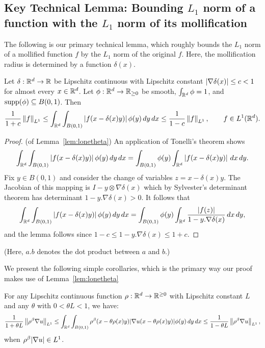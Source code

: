 \subsection{Key Technical Lemma: Bounding $L_1$ norm of a
  function with the $L_1$ norm of its
    mollification}\label{sec:key_lemma}
The following is our primary technical lemma, which roughly bounds the
$L_1$ norm of a mollified function $f$ by the $L_1$
norm of the original $f$. Here, the mollification radius is
determined by a function $\delta(x)$.
\begin{lemma} \label{lem:lonetheta} 

  Let
  $\delta:\mathbb{R}^d\to\mathbb{R}$ be Lipschitz continuous with Lipschitz constant
  $|\nabla\delta(x)| \leq c < 1$ for almost every $x \in \mathbb{R}^d$. Let
  $\phi:\mathbb{R}^d\to\mathbb{R}_{\geq 0}$ be smooth, $\int_{\mathbb{R}^d}\phi = 1$, and
  $\operatorname{supp}(\phi)\subseteq B(0,1)$.  Then
  \[
  \frac{1}{1+c}\left\lVert f \right\rVert_{L^1}
  \leq \int_{\mathbb{R}^d} \int_{B(0,1)} 
  \left| f(x-\delta(x) y) \right|\phi(y)\,dy\,dx\leq
  \frac{1}{1-c}\left\lVert f \right\rVert_{L^1},
  \qquad
  f \in L^1(\mathbb{R}^d).
  \]
\end{lemma}

\begin{proof} (of Lemma~\ref{lem:lonetheta})
An application of Tonelli's theorem shows
\begin{align}
\int_{\mathbb{R}^d} \int_{B(0,1)} \left| f(x-\delta(x) y) \right|\phi(y)\,dy\,dx
=  \int_{B(0,1)}\phi(y)\int_{\mathbb{R}^d} \left| f(x-\delta(x)y) \right|\,dx\,dy.
\end{align}
Fix $y\in B(0,1)$ and consider the change of variables $z = x-\delta(x)y$. The
Jacobian of this mapping is $I - y \otimes \nabla \delta(x)$ which by Sylvester's determinant theorem has
determinant $1-y.\nabla \delta(x) > 0$. It follows that
\begin{align}
\int_{\mathbb{R}^d} \int_{B(0,1)} 
\left| f(x-\delta(x) y) \right|\phi(y)\,dy\,dx
=  \int_{B(0,1)}\phi(y)\int_{\mathbb{R}^d} 
\frac{|f(z)|}{1-y.\nabla \delta(x)} \, dx \,dy,
\end{align}
and the lemma follows since $1-c \leq 1-y.\nabla \delta(x) \leq 1+c$.
\end{proof}
(Here, $a.b$ denotes the dot product between $a$ and $b$.)

We present the following simple corollaries, which is the primary
way our proof makes use of Lemma~\ref{lem:lonetheta}

\begin{corollary}\label{cor:lonetheta}
For any Lipschitz continuous function $\rho: \mathbb{R}^d \rightarrow \mathbb{R}^{\geq 0}$
with Lipschitz constant $L$ and any $\theta$ with $0 < \theta L < 1$, we have:
$$
\frac{1}{1+\theta L} \left\lVert \rho^\beta\nabla u \right\rVert_{L^1}
\leq \int_{\mathbb{R}^d} \int_{B(0,1)} \rho^\beta ( x - \theta \rho(x) y)
  |\nabla u(x-\theta \rho(x)y)| \phi(y)\,dy\,dx
 \leq \frac{1}{1-\theta L} \left\lVert  \rho^\beta\nabla u \right\rVert_{L^1},
$$
when $\rho^\beta |\nabla u| \in {L^1}$.
\end{corollary}

